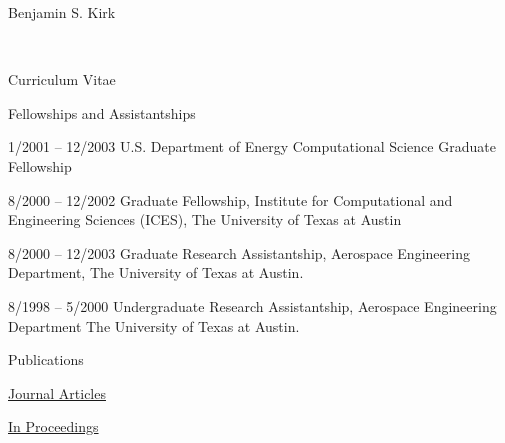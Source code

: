 \documentclass[10pt]{report}
\begin{document}
\begin{cv}{\centerline{\Large Benjamin S. Kirk}\\
    \centerline{\large Curriculum Vitae}}
  \begin{cvlist}{Fellowships and Assistantships}
    \item[1/2001 -- 12/2003]
      U.S. Department of Energy Computational Science Graduate Fellowship
    \item[8/2000 -- 12/2002]
      Graduate Fellowship,
      Institute for Computational and Engineering Sciences (ICES),
      The University of Texas at Austin
    \item[8/2000 -- 12/2003]
      Graduate Research Assistantship,
      Aerospace Engineering Department,
      The University of Texas at Austin.
    \item[8/1998 -- 5/2000]
      Undergraduate Research Assistantship,
      Aerospace Engineering Department
      The University of Texas at Austin.
  \end{cvlist}


  \begin{cvlist}{Publications}

    \item[\underline{Journal Articles}]    

    \item[\underline{In Proceedings}]    


\end{cvlist}
\end{cv}
\end{document}
